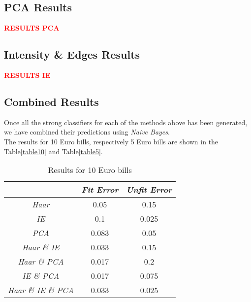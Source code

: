 \documentclass[11pt,twocolumn]{article}
\newcommand{\todo}[1]{\textcolor{red}{\textbf{#1}}}
\begin{document}
	\subsection{PCA Results}\label{sec:pca_results}
	\todo{RESULTS PCA}

	\subsection{Intensity \& Edges Results}\label{sec:ie_results}
	\todo{RESULTS IE}

	\subsection{Combined Results}\label{sec:comb_results}
	\hspace*{10px}Once all the strong classifiers for each of the methods above has been generated, we have combined their predictions using \emph{Naive Bayes}.\\
	\hspace*{10px}The results for 10 Euro bills, respectively 5 Euro bills are shown in the Table\ref{table10} and Table\ref{table5}.
		\begin{table}[!htbp]
			\caption{Results for 10 Euro bills}
			\selectfont\small
			\label{table10}
			\centering 
			\begin{tabular}{ | c | c | c|}
				\hline\hline & \emph{Fit Error} & \emph{Unfit Error} \\ [0.5ex]\hline 
				\emph{Haar} & 0.05 & 0.15 \\ [0.5ex]\hline
				\emph{IE} & 0.1 & 0.025 \\ [0.5ex]\hline
				\emph{PCA} & 0.083 & 0.05 \\ [0.5ex]\hline
				\emph{Haar \& IE} & 0.033 & 0.15 \\ [0.5ex]\hline
				\emph{Haar \& PCA} & 0.017 & 0.2 \\ [0.5ex]\hline
				\emph{IE \& PCA} & 0.017 & 0.075 \\ [0.5ex]\hline
				\emph{Haar \& IE \& PCA} & 0.033 & 0.025 \\ [0.5ex]\hline
			\end{tabular}
			\label{table:nonlin} 
		\end{table}		
\end{document}
